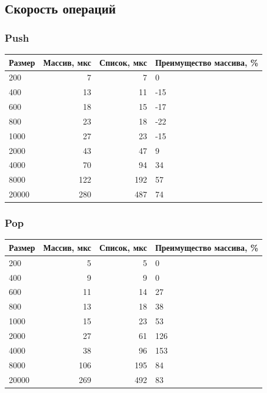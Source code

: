 \documentclass[a4paper,12pt]{extarticle}
\begin{document}
\subsection{Скорость операций}

\subsubsection{Push}

\begin{tabular}{ |l|r|r|l| }
\hline
\textbf{Размер}  & \textbf{Массив, мкс} & \textbf{Список, мкс} & \textbf{Преимущество массива, \%} \\ \hline

200 & 7 & 7 & 0 \\ \hline
400 & 13 & 11 & -15 \\ \hline
600 & 18 & 15 & -17 \\ \hline
800 & 23 & 18 & -22 \\ \hline
1000 & 27 & 23 & -15 \\ \hline
2000 & 43 & 47 & 9 \\ \hline
4000 & 70 & 94 & 34 \\ \hline
8000 & 122 & 192 & 57 \\ \hline
20000 & 280 & 487 & 74 \\ \hline

\end{tabular}

\subsubsection{Pop}

\begin{tabular}{ |l|r|r|l| }
\hline
\textbf{Размер}  & \textbf{Массив, мкс} & \textbf{Список, мкс} & \textbf{Преимущество массива, \%} \\ \hline

200 & 5 & 5 & 0 \\ \hline
400 & 9 & 9 & 0 \\ \hline
600 & 11 & 14 & 27 \\ \hline
800 & 13 & 18 & 38 \\ \hline
1000 & 15 & 23 & 53 \\ \hline
2000 & 27 & 61 & 126 \\ \hline
4000 & 38 & 96 & 153 \\ \hline
8000 & 106 & 195 & 84 \\ \hline
20000 & 269 & 492 & 83 \\ \hline

\end{tabular}
\end{document}

